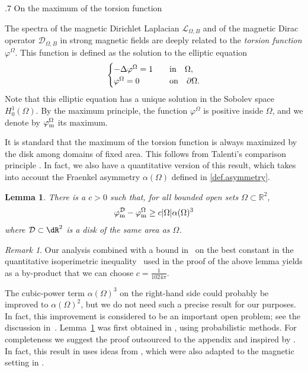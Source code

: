 \documentclass[11pt,a4paper]{amsart}
\makeatletter
\newcommand\Omg{\Omega}
\def\section{\@startsection{section}{1}\z@{.9\linespacing\@plus\linespacing}%
	{.7\linespacing} {\fontsize{13}{14}\selectfont\bfseries\centering}}
\numberwithin{figure}{section}
\numberwithin{equation}{section}
\theoremstyle{plain}%
\theoremstyle{remark}
\newtheorem{remark}[thm]{Remark}
\theoremstyle{plain}
\newcommand\cD{\mathcal D}
\newcommand\cF{\mathcal F}
\def\cD{{\mathcal D}}   \def\cE{{\mathcal E}}   \def\cF{{\mathcal F}}
\newtheorem{lemma}[theorem]{Lemma}
\newcommand{\R}{\mathbb R}
\makeatother
\begin{document}
\section{On the maximum of the torsion function}\label{sec.torsion}

The spectra of the magnetic Dirichlet Laplacian $\mathscr{L}_{\Omega,B}$ and of the magnetic Dirac operator $\mathscr{D}_{\Omega,B}$ in strong magnetic fields are deeply related to the \emph{torsion function} $\varphi^\Omega$. This function is defined as the solution to the elliptic equation
\begin{equation}
\begin{cases}
-\Delta \varphi^\Omega = 1 &\quad {\rm in} \quad \Omega,\\
\varphi^\Omega = 0 &\quad {\rm on} \quad \partial \Omega.
\end{cases}
\end{equation}
Note that this elliptic equation has a unique solution in the Sobolev space $H^1_0(\Omg)$.
By the maximum principle, the function $\varphi^\Omega$ is positive inside $\Omega$, and we denote by $\varphi^\Omega_{\rm m}$ its maximum.

It is standard that the maximum of the torsion function is always maximized by the disk among domains of fixed area. This follows from Talenti's comparison principle \cite[Theorem 1]{Talenti}. In fact, we also have a quantitative version of this result, which takes into account the Fraenkel asymmetry $\alpha(\Omega)$ defined in \eqref{def.asymmetry}.

\begin{lemma}\label{lem.torsion} There is a $c >0$ such that, for all bounded open sets $\Omega \subset \R^2$,
\[ \varphi_{\rm m}^{\cD} - \varphi_{\rm m}^\Omega \geq c |\Omega| \alpha(\Omega)^3\]
where $\cD\subset\dR^2$ is a disk of the same area as $\Omega$.
\end{lemma}
\begin{remark}
	Our analysis combined with a bound in~\cite{LZDJ15} on the best constant in the quantitative isoperimetric inequality~\cite{FMP} used in the proof of the above lemma yields as a by-product that we can choose 
	$c = \frac{1}{1024\pi}$.  
\end{remark}
%
The cubic-power term $\alpha(\Omega)^3$ on the right-hand side could probably be improved to $\alpha(\Omega)^2$, but we do not need such a precise result for our purposes. In fact, this improvement is considered to be an important open problem; see the discussion in~\cite{AL25}. Lemma~\ref{lem.torsion} was first obtained in \cite{Kim}, using probabilistic methods. For completeness we suggest the proof outsourced to the appendix and inspired by \cite[Theorem 1.2]{ABMP23}. In fact, this result in \cite{ABMP23} uses ideas from \cite{HN}, which were also adapted to the magnetic setting in \cite{GJM}.
\end{document}
